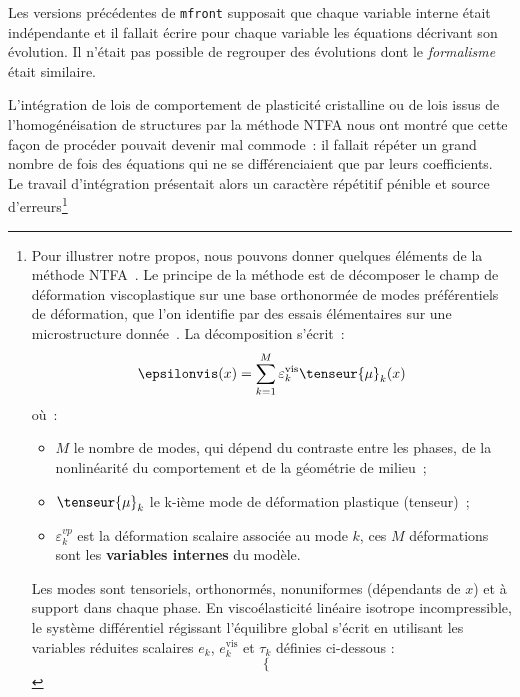 \documentclass[12pt]{article}
\newcommand{\mfront}{\texttt{mfront}}
\begin{document}
Les versions précédentes de \mfront{} supposait que chaque variable
interne était indépendante et il fallait écrire pour chaque variable les
équations décrivant son évolution. Il n'était pas possible de regrouper
des évolutions dont le {\em formalisme} était similaire.

L'intégration de lois de comportement de plasticité cristalline ou de
lois issus de l'homogénéisation de structures par la méthode
NTFA nous ont montré que cette façon de procéder pouvait devenir mal
commode~: il fallait répéter un grand nombre de fois des équations qui
ne se différenciaient que par leurs coefficients. Le travail
d'intégration présentait alors un caractère répétitif pénible et source
d'erreurs\footnote{Pour illustrer notre propos, nous pouvons donner quelques
  éléments de la méthode NTFA~\cite{blanc:ver}. Le principe de la méthode
  est de décomposer le champ de déformation viscoplastique sur une base
  orthonormée de modes préférentiels de déformation, que l'on identifie
  par des essais élémentaires sur une microstructure
  donnée~\cite{largenton12:_model_mox}. La décomposition s'écrit~:
  \begin{equation}
    \label{eq:decoeps} \epsilonvis(x) = \sum_{k=1}^M \varepsilon^{\mathrm{vis}}_k
    \tenseur{\mu}_k(x)
  \end{equation}
  où~:
  \begin{minipage}[t]{0.9\linewidth}
    \begin{itemize} \item \(M\) le nombre de modes, qui dépend du
      contraste entre les phases, de la nonlinéarité du comportement et
      de la géométrie de milieu~; \item \(\tenseur{\mu}_k\) le k-ième
      mode de déformation plastique (tenseur)~; \item
      \(\varepsilon^{vp}_k\) est la déformation scalaire associée au
      mode \(k\), ces \(M\) déformations sont les {\bf variables
      internes} du modèle.
  \end{itemize}
\end{minipage} \medskip Les modes sont tensoriels, orthonormés,
nonuniformes (dépendants de \(x\)) et à support dans chaque phase. En
viscoélasticité linéaire isotrope incompressible, le système
différentiel régissant l'équilibre global s'écrit en utilisant les
variables réduites scalaires \(e_k\), \(e_k^{\mathrm{vis}}\) et
\(\tau_k\) définies ci-dessous :
\begin{equation}
  \label{eq:modeleeffectif} \displaystyle \left\{
  \begin{array}{rcl}

\end{array}
\end{equation}}
\end{document}
